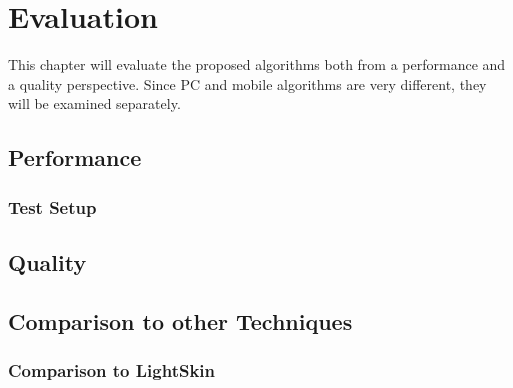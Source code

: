 \documentclass[thesis.tex]{subfiles}
\begin{document}
\chapter{Evaluation}
This chapter will evaluate the proposed algorithms both from a performance and a quality perspective. Since PC and mobile algorithms are very different, they will be examined separately.

\section{Performance}

\subsection{Test Setup}

\newpage

\section{Quality}

\section{Comparison to other Techniques}

\subsection{Comparison to LightSkin}

\subfilebib %
\end{document}
